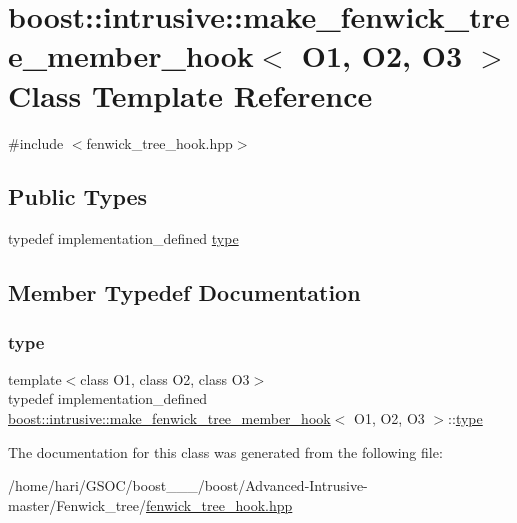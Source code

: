 \hypertarget{classboost_1_1intrusive_1_1make__fenwick__tree__member__hook}{}\section{boost\+:\+:intrusive\+:\+:make\+\_\+fenwick\+\_\+tree\+\_\+member\+\_\+hook$<$ O1, O2, O3 $>$ Class Template Reference}
\label{classboost_1_1intrusive_1_1make__fenwick__tree__member__hook}


{\ttfamily \#include $<$fenwick\+\_\+tree\+\_\+hook.\+hpp$>$}

\subsection*{Public Types}
\begin{DoxyCompactItemize}
\item 
typedef implementation\+\_\+defined \hyperlink{classboost_1_1intrusive_1_1make__fenwick__tree__member__hook_ad113dd3ebabb90b71168df649ccd07f7}{type}
\end{DoxyCompactItemize}


\subsection{Member Typedef Documentation}
\mbox{\label{classboost_1_1intrusive_1_1make__fenwick__tree__member__hook_ad113dd3ebabb90b71168df649ccd07f7}} 
\subsubsection{\texorpdfstring{type}{type}}
{\footnotesize\ttfamily template$<$class O1, class O2, class O3$>$ \\
typedef implementation\+\_\+defined \hyperlink{classboost_1_1intrusive_1_1make__fenwick__tree__member__hook}{boost\+::intrusive\+::make\+\_\+fenwick\+\_\+tree\+\_\+member\+\_\+hook}$<$ O1, O2, O3 $>$\+::\hyperlink{classboost_1_1intrusive_1_1make__fenwick__tree__member__hook_ad113dd3ebabb90b71168df649ccd07f7}{type}}



The documentation for this class was generated from the following file\+:\begin{DoxyCompactItemize}
\item 
/home/hari/\+G\+S\+O\+C/boost\+\_\+\_\+\_/boost/\+Advanced-\/\+Intrusive-\/master/\+Fenwick\+\_\+tree/\hyperlink{fenwick__tree__hook_8hpp}{fenwick\+\_\+tree\+\_\+hook.\+hpp}\end{DoxyCompactItemize}
